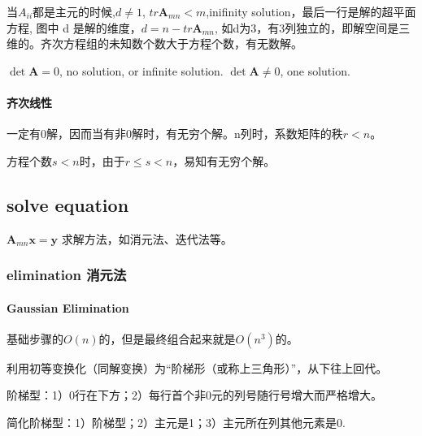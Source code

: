 \documentclass[UTF8]{../../09-Mathematics}
\begin{document}
当$A_{ii}$都是主元的时候,$d \neq 1$, $tr \boldsymbol A_{mn} < m$,inifinity solution，最后一行是解的超平面方程, 图中 d 是解的维度，$d =  n -tr \boldsymbol A_{mn}$, 如d为3，有3列独立的，即解空间是三维的。齐次方程组的未知数个数大于方程个数，有无数解。



$\det \boldsymbol A = 0$, no solution, or infinite solution.
$\det \boldsymbol A \neq 0$, one solution.




\paragraph{齐次线性}

一定有0解，因而当有非0解时，有无穷个解。n列时，系数矩阵的秩$r < n$。

方程个数$s < n$时，由于$r  \leqslant s < n$，易知有无穷个解。


\subsection{solve equation}

$\boldsymbol A_{mn} \boldsymbol x  =  \boldsymbol y$
求解方法，如消元法、迭代法等。

\subsubsection{elimination 消元法}


\paragraph{Gaussian Elimination}

基础步骤的$O(n)$的，但是最终组合起来就是$O(n^3)$的。


利用初等变换化（同解变换）为“阶梯形（或称上三角形）”，从下往上回代。

阶梯型：1）0行在下方；2）每行首个非0元的列号随行号增大而严格增大。

简化阶梯型：1）阶梯型；2）主元是1；3）主元所在列其他元素是0.
\end{document}
